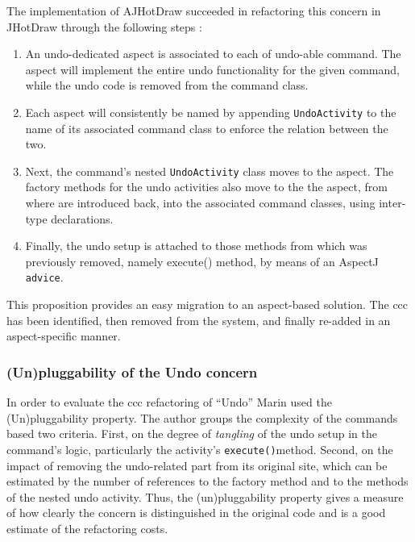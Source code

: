 The implementation of AJHotDraw succeeded in refactoring this concern in JHotDraw through the following steps \cite{marin2004refactoring}:

\begin{enumerate}

	\item An undo-dedicated aspect is associated to each of undo-able command. 
	The aspect will implement the entire undo functionality for the given command, while the undo code is removed from the command class.

 	\item Each aspect will consistently be named by appending \texttt{UndoActivity} to the name of its associated command class to enforce the relation between the two.

	\item Next, the command's nested \texttt{UndoActivity} class moves to the aspect. 
	The factory methods for the undo activities also move to the the aspect, from where are introduced back, into the associated command classes, using inter-type declarations.

	\item Finally, the undo setup is attached to those methods from which was previously removed, namely execute() method, by means of an AspectJ \texttt{advice}.

\end{enumerate}

This proposition \cite{marin2004refactoring} provides an easy migration to an aspect-based solution. 
The \ac{ccc} has been identified, then removed from the system, and finally re-added in an aspect-specific manner.

\subsubsection{(Un)pluggability of the Undo concern}
In order to evaluate the \ac{ccc} refactoring of ``Undo'' Marin \cite{marin2004refactoring} used the (Un)pluggability property. The author groups the complexity of the commands based two criteria.
First, on the degree of \textit{tangling} of the undo setup in the command's logic, particularly the activity's \texttt{execute()}method. 
Second, on the impact of removing the undo-related part from its original site, which can be estimated by the number of references to the factory method and to the methods of the nested undo activity.
Thus, the (un)pluggability property gives a measure of how clearly the concern is distinguished in the original code and is a good estimate of the refactoring costs.

